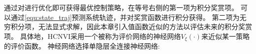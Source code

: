 


通过对进行优化即可获得最优控制策略，在等号右侧的第一项为积分奖赏项。
可以通过\eqref{equ:state_traj}预测系统轨迹，并对奖赏函数进行积分获得。
第二项为无穷积分项，无法显式求解，因此本章引入值函数近似的方法以评估未来的积分奖赏项。
具体地，HCNVI采用一个被称为评价网络的神经网络$V_\xi(\cdot)$来近似某一策略的评价函数。
神经网络选择单隐层全连接神经网络:


